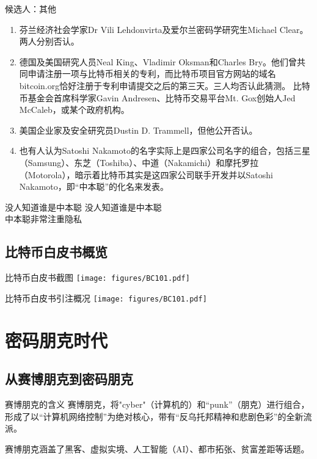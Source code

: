 \documentclass[11pt]{beamer}
\begin{document}
\begin{frame}{候选人：其他}
\begin{enumerate}
	\small
	\item 芬兰经济社会学家Dr Vili Lehdonvirta及爱尔兰密码学研究生Michael Clear。两人分别否认。
	\item 德国及美国研究人员Neal King、Vladimir Oksman和Charles Bry。他们曾共同申请注册一项与比特币相关的专利，而比特币项目官方网站的域名bitcoin.org恰好注册于专利申请提交之后的第三天。三人均否认此猜测。
	比特币基金会首席科学家Gavin Andresen、比特币交易平台Mt. Gox创始人Jed McCaleb，或某个政府机构。
	\item 美国企业家及安全研究员Dustin D. Trammell，但他公开否认。
	\item 也有人认为Satoshi Nakamoto的名字实际上是四家公司名字的组合，包括三星（Samsung）、东芝（Toshiba）、中道（Nakamichi）和摩托罗拉（Motorola），暗示着比特币其实是这四家公司联手开发并以Satoshi Nakamoto，即“中本聪”的化名来发表。
\end{enumerate}
\end{frame}

\begin{frame}{没人知道谁是中本聪}
		\centering
		没人知道谁是中本聪\\
		中本聪非常注重隐私
\end{frame}

\subsection{比特币白皮书概览}
\begin{frame}{比特币白皮书截图}
	\centering
	\texttt{[image: figures/BC101.pdf]}
\end{frame}

\begin{frame}{比特币白皮书引注概况}
	\centering
	\texttt{[image: figures/BC101.pdf]}
\end{frame}

\section{密码朋克时代}
\subsection{从赛博朋克到密码朋克}
\begin{frame}{赛博朋克的含义}
	赛博朋克，将"cyber"（计算机的）和“punk”（朋克）进行组合，形成了以“计算机网络控制”为绝对核心，带有“反乌托邦精神和悲剧色彩”的全新流派。
	
	赛博朋克涵盖了黑客、虚拟实境、人工智能（AI）、都市拓张、贫富差距等话题。
\end{frame}
\end{document}
